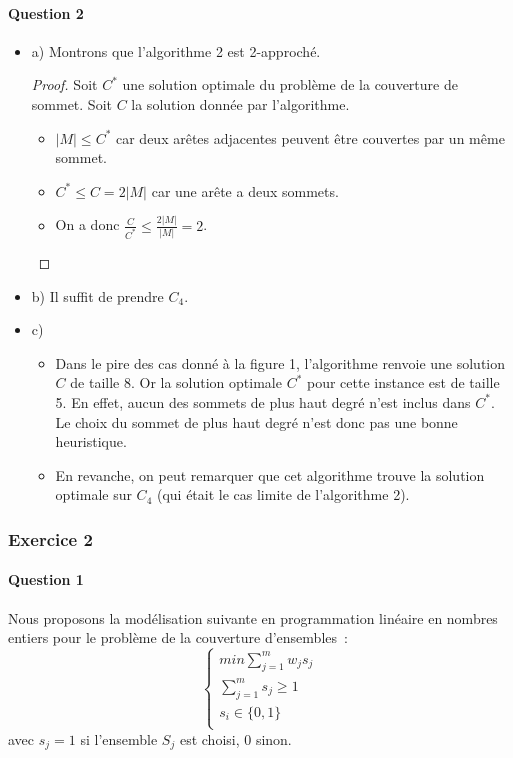 \documentclass[a4paper, 12pt]{article}
\begin{document}
\paragraph{Question 2}

\begin{itemize}
\item[] a) Montrons que l'algorithme 2 est 2-approché.
\begin{proof}
Soit $C^{*}$ une solution optimale du problème de la couverture de
sommet. Soit $C$ la solution donnée par l'algorithme. 
\begin{itemize}
\item[] $|M| \leq C^{*}$ car deux arêtes adjacentes peuvent être
  couvertes par un même sommet.
\item[] $C^{*} \leq C = 2 |M|$ car une arête a deux sommets.
\item[] On a donc $\frac{C}{C^{*}} \leq \frac{2|M|}{|M|} = 2$.
\end{itemize}
\end{proof}
\item[] b) Il suffit de prendre $C_4$.
\item[] c) 
\begin{itemize}
\item[] Dans le pire des cas donné à la figure 1, l'algorithme renvoie
  une solution $C$ de taille 8. Or la solution optimale $C^*$ pour cette
  instance est de taille 5. En effet, aucun des sommets de plus haut
  degré n'est inclus dans $C^{*}$. Le choix du sommet de plus haut
  degré n'est donc pas une bonne heuristique. 
\item[] En revanche, on peut remarquer que cet algorithme trouve la
  solution optimale sur $C_4$ (qui était le cas limite de l'algorithme 2).
\end{itemize}
\end{itemize}

\subsubsection*{Exercice 2}

\paragraph{Question 1}

Nous proposons la modélisation suivante en programmation linéaire en
nombres entiers pour le problème de la couverture d'ensembles~:
\begin{equation}
\begin{cases}
min \sum_{j=1}^m w_j s_j\\
\sum_{j=1}^{m} s_{j} \geq 1 \\
s_i \in \{0,1\} \\
\end{cases}
\end{equation}
avec $s_j = 1$ si l'ensemble $S_j$ est choisi, 0 sinon.
\end{document}
